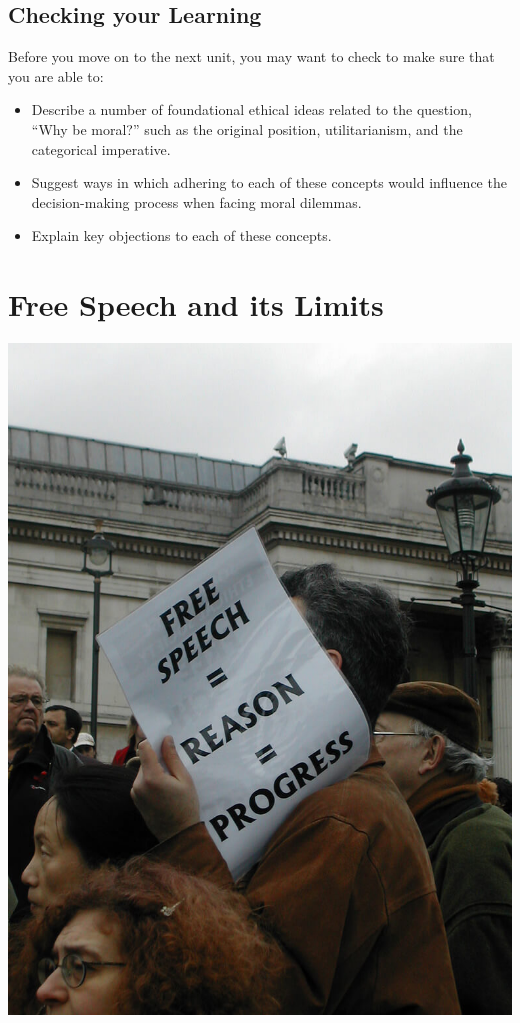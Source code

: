 \documentclass[
]{book}
\providecommand{\tightlist}{%
  \setlength{\itemsep}{0pt}\setlength{\parskip}{0pt}}
\begin{document}
\hypertarget{checking-your-learning-3}{%
\section*{Checking your Learning}\label{checking-your-learning-3}}

\begin{progress}
Before you move on to the next unit, you may want to check to make sure that you are able to:

\begin{itemize}
\tightlist
\item
  Describe a number of foundational ethical ideas related to the question,
  ``Why be moral?'' such as the original position, utilitarianism, and the
  categorical imperative.\\
\item
  Suggest ways in which adhering to each of these concepts would influence the decision-making process when facing moral dilemmas.\\
\item
  Explain key objections to each of these concepts.
\end{itemize}
\end{progress}

\hypertarget{free-speech-and-its-limits}{%
\chapter{Free Speech and its Limits}\label{free-speech-and-its-limits}}

\includegraphics{assets/unit_5/U5_117704119_65c60568e1_b.jpg}
\end{document}
